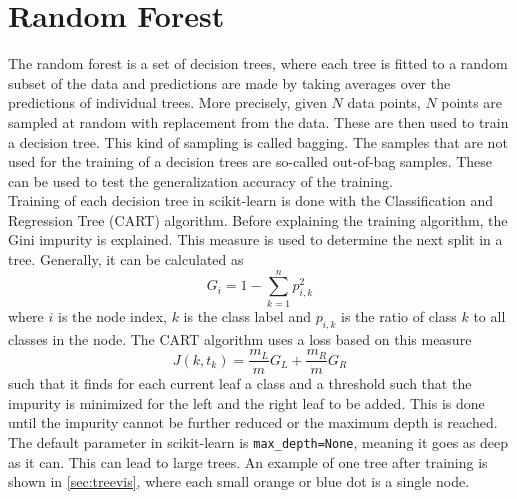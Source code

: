 \documentclass[final]{article}
\begin{document}
\section{Random Forest}
The random forest is a set of decision trees, where each tree is fitted to a
random subset of the data and predictions are made by taking averages over the
predictions of individual trees. More precisely, given $N$ data points, $N$
points are sampled at random with replacement from the data. These are then
used to train a decision tree. This kind of sampling is called bagging. The
samples that are not used for the training of a decision trees are so-called
out-of-bag samples. These can be used to test the generalization accuracy of
the training.\\
Training of each decision tree in scikit-learn is done with the Classification
and Regression Tree (CART) algorithm.  Before explaining the training
algorithm, the Gini impurity is explained. This measure is used to determine
the next split in a tree. Generally, it can be calculated as
\begin{equation}
G_i = 1 - \sum_{k=1}^{n}p_{i,k}^2
\end{equation}
where $i$ is the node index, $k$ is the class label and $p_{i,k}$ is the ratio
of class $k$ to all classes in the node. The CART algorithm uses a loss based
on this measure
\begin{equation}
J(k, t_k) = \frac{m_L}{m}G_L + \frac{m_R}{m}G_R
\end{equation}
such that it finds for each current leaf a class and a threshold such that the
impurity is minimized for the left and the right leaf to be added. This is done
until the impurity cannot be further reduced or the maximum depth is reached.
The default parameter in scikit-learn is \verb+max_depth=None+, meaning it goes
as deep as it can. This can lead to large trees. An example of one tree after
training is shown in \cref{sec:treevis}, where each small orange or blue dot is
a single node.
\end{document}
